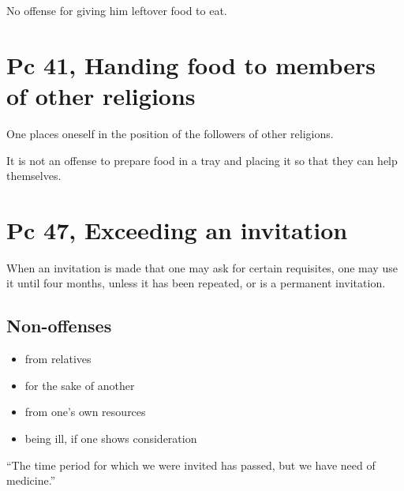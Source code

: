 No offense for giving him leftover food to eat.

\section{Pc 41, Handing food to members of other religions}

One places oneself in the position of the followers of other religions.

It is not an offense to prepare food in a tray and placing it so that
they can help themselves.

\clearpage

\section{Pc 47, Exceeding an invitation}

When an invitation is made that one may ask for certain requisites, one
may use it until four months, unless it has been repeated, or is a
permanent invitation.

\subsection{Non-offenses}

\begin{multicols}{2}

\begin{itemize}
\tightlist
\item
  from relatives
\item
  for the sake of another
\item
  from one's own resources
\item
  being ill, if one shows consideration
\end{itemize}

\end{multicols}

``The time period for which we were invited has passed, but we have need
of medicine.''

